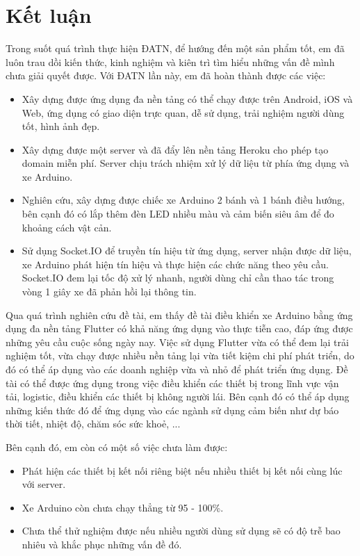 \documentclass[../DoAn.tex]{subfiles}
\begin{document}
\section{Kết luận}

Trong suốt quá trình thực hiện ĐATN, để hướng đến một sản phẩm tốt, em đã luôn trau dồi kiến thức, kinh nghiệm và kiên trì tìm hiểu những vấn đề mình chưa giải quyết được. Với ĐATN lần này, em đã hoàn thành được các việc:
\begin{itemize}
    \item Xây dựng được ứng dụng đa nền tảng có thể chạy được trên Android, iOS và Web, ứng dụng có giao diện trực quan, dễ sử dụng, trải nghiệm người dùng tốt, hình ảnh đẹp.
    \item Xây dựng được một server và đã đẩy lên nền tảng Heroku cho phép tạo domain miễn phí. Server chịu trách nhiệm xử lý dữ liệu từ phía ứng dụng và xe Arduino.
    \item Nghiên cứu, xây dựng được chiếc xe Arduino 2 bánh và 1 bánh điều hướng, bên cạnh đó có lắp thêm đèn LED nhiều màu và cảm biến siêu âm để đo khoảng cách vật cản.
    \item Sử dụng Socket.IO để truyền tín hiệu từ ứng dụng, server nhận được dữ liệu, xe Arduino phát hiện tín hiệu và thực hiện các chức năng theo yêu cầu. Socket.IO đem lại tốc độ xử lý nhanh, người dùng chỉ cần thao tác trong vòng 1 giây xe đã phản hồi lại thông tin.
\end{itemize}

Qua quá trình nghiên cứu đề tài, em thấy đề tài điều khiển xe Arduino bằng ứng dụng đa nền tảng Flutter có khả năng ứng dụng vào thực tiễn cao, đáp ứng được những yêu cầu cuộc sống ngày nay. Việc sử dụng Flutter vừa có thể đem lại trải nghiệm tốt, vừa chạy được nhiều nền tảng lại vừa tiết kiệm chi phí phát triển, do đó có thể áp dụng vào các doanh nghiệp vừa và nhỏ để phát triển ứng dụng. Đề tài có thể được ứng dụng trong việc điều khiển các thiết bị trong lĩnh vực vận tải, logistic, điều khiển các thiết bị không người lái. Bên cạnh đó có thể áp dụng những kiến thức đó để ứng dụng vào các ngành sử dụng cảm biến như dự báo thời tiết, nhiệt độ, chăm sóc sức khoẻ, ...

Bên cạnh đó, em còn có một số việc chưa làm được:
\begin{itemize}
    \item Phát hiện các thiết bị kết nối riêng biệt nếu nhiều thiết bị kết nối cùng lúc với server.
    \item Xe Arduino còn chưa chạy thẳng từ 95 - 100\%.
    \item Chưa thể thử nghiệm được nếu nhiều người dùng sử dụng sẽ có độ trễ bao nhiêu và khắc phục những vấn đề đó.
\end{itemize}
\end{document}
